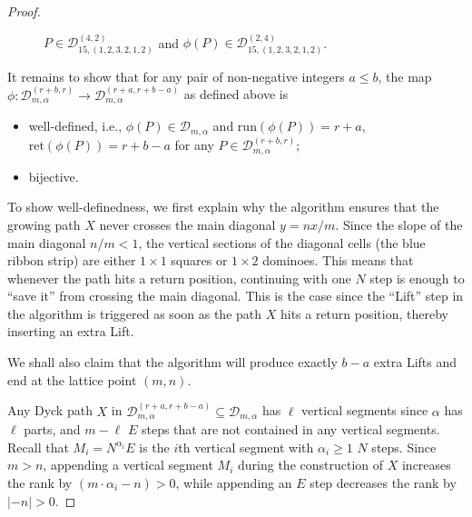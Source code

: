\documentclass[11pt,a4paper,reqno]{article}
\newcommand{\DD}{\mathcal{D}}
\newcommand{\run}{\mathrm{run}}
\newcommand{\ret}{\mathrm{ret}}
\newcommand{\al}{\alpha}
\newcommand{\signseq}[2]{
	\foreach \x/\y [count=\i] in {#2} {
		\node at ($(#1)+(\i-0.5,\x-0.5)$) {$\y$};
	};
}
\newcommand{\signseqb}[2]{
	\foreach \x/\y [count=\i] in {#2} {
		\node[cyan] at ($(#1)+(\i-0.5,\x-0.5)$) {$\y$};
	};
}
\newcommand{\LiLan}{}
\begin{document}
{\begin{proof}
\begin{figure}[ht!]
			\caption{$P\in\DD_{15,(1,2,3,2,1,2)}^{(4,2)}$ and $\phi(P)\in\DD_{15,(1,2,3,2,1,2)}^{(2,4)}$.}
			\label{fig:phieg}
		\end{figure}
		
		It remains to show that for any pair of non-negative integers $a\leq b$, the map $\phi:\DD_{m,\al}^{(r+b,r)}\rightarrow\DD_{m,\al}^{(r+a,r+b-a)}$ as defined above is 
		\begin{itemize}
			\item well-defined, i.e., $\phi(P)\in\DD_{m,\al}$ and $\run(\phi(P))=r+a$, $\ret(\phi(P))=r+b-a$ for any $P\in \DD_{m,\al}^{(r+b,r)}$;
			\item bijective.
		\end{itemize}
		To show well-definedness, we first explain why the algorithm ensures that the growing path $X$ never crosses the main diagonal $y=nx/m$. Since the slope of the main diagonal $n/m<1$, the vertical sections of the diagonal cells (the blue ribbon strip) are either $1\times 1$ squares or $1\times 2$ dominoes. This means that whenever the path hits a return position, continuing with one $N$ step is enough to ``save it'' from crossing the main diagonal. This is the case since the ``Lift'' step in the algorithm is triggered as soon as the path $X$ hits a return position{\LiLan, thereby inserting} an extra Lift. 

        We shall also claim that the algorithm will produce exactly $b-a$ extra Lifts and end at the lattice point $(m,n)$. 
        {\LiLan Any Dyck path $X$ in $\DD_{m,\al}^{(r+a,r+b-a)}\subseteq\DD_{m,\al}$ has $\ell$ vertical segments since $\al$ has $\ell$ parts, and $m-\ell$ $E$ steps that are not contained in any vertical segments. Recall that $M_i=N^{\al_i}E$ is the $i$th vertical segment with $\al_i\geq 1$ $N$ steps. Since $m>n$, appending a vertical segment $M_i$ during the construction of $X$ increases the rank by $(m\cdot \al_i - n)>0$, while appending an $E$ step decreases the rank by $|-n|>0$.

}
\end{proof}}
\end{document}
